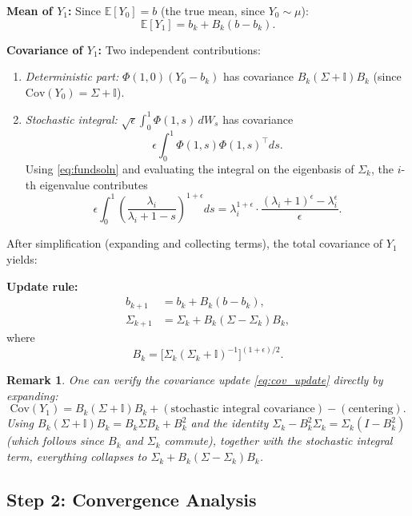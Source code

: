 \documentclass[12pt,fleqn]{article}
\numberwithin{equation}{section}
\newtheorem{remark}{Remark}
\newcommand{\I}{\mathbb{I}}
\begin{document}
\textbf{Mean of $Y_1$:} Since $\mathbb E[Y_0] = b$ (the true mean, since $Y_0 \sim \mu$):
\[
	\mathbb E[Y_1] = b_k + B_k(b - b_k).
\]

\textbf{Covariance of $Y_1$:} Two independent contributions:
\begin{enumerate}
	\item \emph{Deterministic part:} $\Phi(1,0)(Y_0 - b_k)$ has covariance $B_k(\Sigma + \I)B_k$ (since $\mathrm{Cov}(Y_0) = \Sigma + \I$).
	\item \emph{Stochastic integral:} $\sqrt{\epsilon}\int_0^1 \Phi(1,s)\,dW_s$ has covariance
	\[
		\epsilon \int_0^1 \Phi(1,s)\Phi(1,s)^\top ds.
	\]
	Using \eqref{eq:fundsoln} and evaluating the integral on the eigenbasis of $\Sigma_k$, the $i$-th eigenvalue contributes
	\[
		\epsilon \int_0^1 \left(\frac{\lambda_i}{\lambda_i + 1-s}\right)^{1+\epsilon} ds = \lambda_i^{1+\epsilon}\cdot\frac{(\lambda_i+1)^\epsilon - \lambda_i^\epsilon}{\epsilon}.
	\]
\end{enumerate}

After simplification (expanding and collecting terms), the total covariance of $Y_1$ yields:
\begin{keybox}
\textbf{Update rule:}
\begin{align}
	b_{k+1} &= b_k + B_k(b - b_k), \label{eq:mean_update}\\
	\Sigma_{k+1} &= \Sigma_k + B_k(\Sigma - \Sigma_k)B_k, \label{eq:cov_update}
\end{align}
where
\begin{equation}
	B_k = \bigl[\Sigma_k(\Sigma_k + \I)^{-1}\bigr]^{(1+\epsilon)/2}. \label{eq:Bk_def}
\end{equation}
\end{keybox}

\begin{remark}
One can verify the covariance update \eqref{eq:cov_update} directly by expanding:
\[
	\mathrm{Cov}(Y_1) = B_k(\Sigma + \I)B_k + (\text{stochastic integral covariance}) - (\text{centering}).
\]
Using $B_k(\Sigma + \I)B_k = B_k \Sigma B_k + B_k^2$ and the identity $\Sigma_k - B_k^2 \Sigma_k = \Sigma_k(I - B_k^2)$ (which follows since $B_k$ and $\Sigma_k$ commute), together with the stochastic integral term, everything collapses to $\Sigma_k + B_k(\Sigma - \Sigma_k)B_k$.
\end{remark}

\subsection{Step 2: Convergence Analysis}
\end{document}
